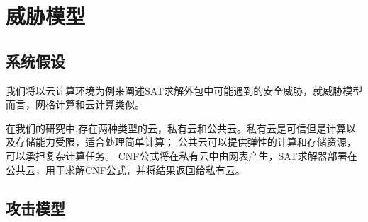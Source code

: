 \section{威胁模型}
\subsection{系统假设}
我们将以云计算环境为例来阐述SAT求解外包中可能遇到的安全威胁，就威胁模型而言，网格计算和云计算类似。

在我们的研究中,存在两种类型的云，私有云和公共云。私有云是可信但是计算以及存储能力受限，适合处理简单计算；
公共云可以提供弹性的计算和存储资源，可以承担复杂计算任务。
CNF公式将在私有云中由网表产生，SAT求解器部署在公共云，用于求解CNF公式，并将结果返回给私有云。

\subsection{攻击模型}


